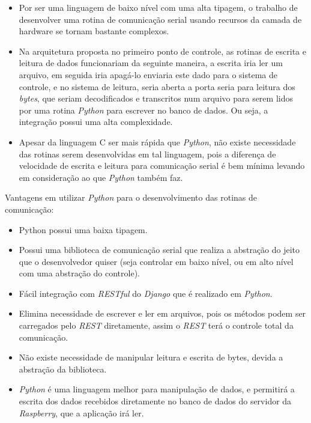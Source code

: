 \begin{itemize}
    \item Por ser uma linguagem de baixo nível com uma alta tipagem, o trabalho de desenvolver uma rotina de comunicação serial usando recursos da camada de hardware se tornam bastante complexos.
    \item Na arquitetura proposta no primeiro ponto de controle, as rotinas de escrita e leitura de dados funcionariam da seguinte maneira, a escrita iria ler um arquivo, em seguida iria apagá-lo enviaria este dado para o sistema de controle, e no sistema de leitura, seria aberta a porta seria para leitura dos \textit{bytes}, que seriam decodificados e transcritos num arquivo para serem lidos por uma rotina \textit{Python} para escrever no banco de dados. Ou seja, a integração possui uma alta complexidade.
    \item Apesar da linguagem C ser mais rápida que \textit{Python}, não existe necessidade das rotinas serem desenvolvidas em tal linguagem, pois a diferença de velocidade de escrita e leitura para comunicação serial é bem mínima levando em consideração ao que \textit{Python} também faz.
\end{itemize}

Vantagens em utilizar \textit{Python} para o desenvolvimento das rotinas de comunicação:

\begin{itemize}
    \item Python possui uma baixa tipagem.
    \item Possui uma biblioteca de comunicação serial que realiza a abstração do jeito que o desenvolvedor quiser (seja controlar em baixo nível, ou em alto nível com uma abstração do controle).
    \item Fácil integração com \textit{RESTful} do \textit{Django} que é realizado em \textit{Python}.
    \item Elimina necessidade de escrever e ler em arquivos, pois os métodos podem ser carregados pelo \textit{REST} diretamente, assim o \textit{REST} terá o controle total da comunicação.
    \item Não existe necessidade de manipular leitura e escrita de bytes, devida a abstração da biblioteca.
    \item \textit{Python} é uma linguagem melhor para manipulação de dados, e permitirá a escrita dos dados recebidos diretamente no banco de dados do servidor da \textit{Raspberry}, que a aplicação irá ler.
\end{itemize}

